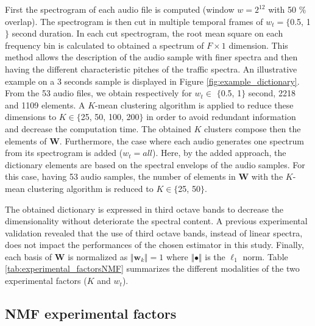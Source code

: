 \documentclass[review,5p,twocolumn,sort&compress,times]{elsarticle}
\begin{document}
First the spectrogram of each audio file is computed (window $w = 2^{12}$ with 50 $\%$ overlap). The spectrogram is then cut in multiple temporal frames of $w_t  = \lbrace$0.5, 1$\rbrace$ second duration. In each cut spectrogram, the root mean square on each frequency bin is calculated to obtained a spectrum of $F \times 1$ dimension. This method allows the description of the audio sample with finer spectra and then having the different characteristic pitches of the traffic spectra. An illustrative example on a 3 seconds sample is displayed in Figure \ref{fig:example_dictionary}. From the 53 audio files, we obtain respectively for $w_t\in$ $\lbrace$0.5, 1$\rbrace$ second, 2218 and 1109 elements. A $K$-mean clustering algorithm is applied to reduce these dimensions to $K \in \lbrace$25, 50, 100, 200$\rbrace$ in order to avoid redundant information and decrease the computation time. The obtained $K$ clusters compose then the elements of $\mathbf{W}$. Furthermore, the case where each audio generates one spectrum from its spectrogram is added ($w_t = all$). Here, by the added approach, the dictionary elements are based on the spectral envelops of the audio samples. For this case, having 53 audio samples, the number of elements in $\mathbf{W}$ with the $K$-mean clustering algorithm is reduced to $K \in \lbrace$25, 50$\rbrace$.

The obtained dictionary is expressed in third octave bands to decrease the dimensionality without deteriorate the spectral content. A previous experimental validation revealed that the use of third octave bands, instead of linear spectra, does not impact the performances of the chosen estimator in this study.  Finally, each basis of $\mathbf{W}$ is normalized as $ \Vert \mathbf{w}_k \Vert = 1$ where $\Vert \bullet \Vert$ is the $\ell_1$ norm. Table \ref{tab:experimental_factorsNMF} summarizes the different modalities of the two experimental factors ($K$ and $w_t$). 

\subsection{NMF experimental factors}
\end{document}
